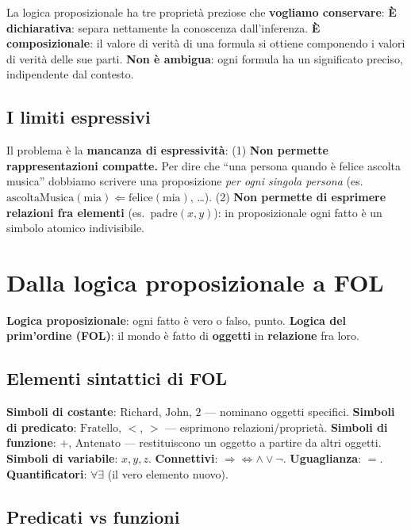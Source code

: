 \documentclass[11pt,a4paper]{report}
\begin{document}
La logica proposizionale ha tre proprietà preziose che \textbf{vogliamo conservare}: \textbf{È dichiarativa}: separa nettamente la conoscenza dall'inferenza. \textbf{È composizionale}: il valore di verità di una formula si ottiene componendo i valori di verità delle sue parti. \textbf{Non è ambigua}: ogni formula ha un significato preciso, indipendente dal contesto.

\subsection*{I limiti espressivi}

Il problema è la \textbf{mancanza di espressività}: (1) \textbf{Non permette rappresentazioni compatte.} Per dire che ``una persona quando è felice ascolta musica'' dobbiamo scrivere una proposizione \emph{per ogni singola persona} (es.\ $\text{ascoltaMusica}(\text{mia}) \Leftarrow \text{felice}(\text{mia})$, \dots). (2) \textbf{Non permette di esprimere relazioni fra elementi} (es.\ $\text{padre}(x,y)$): in proposizionale ogni fatto è un simbolo atomico indivisibile.

\section{Dalla logica proposizionale a FOL}

\textbf{Logica proposizionale}: ogni fatto è vero o falso, punto. \textbf{Logica del prim'ordine (FOL)}: il mondo è fatto di \textbf{oggetti} in \textbf{relazione} fra loro.

\subsection*{Elementi sintattici di FOL}

\textbf{Simboli di costante}: $\text{Richard}$, $\text{John}$, $2$ --- nominano oggetti specifici. \textbf{Simboli di predicato}: $\text{Fratello}$, $<$, $>$ --- esprimono relazioni/proprietà. \textbf{Simboli di funzione}: $+$, $\text{Antenato}$ --- restituiscono un oggetto a partire da altri oggetti. \textbf{Simboli di variabile}: $x,y,z$. \textbf{Connettivi}: $\Rightarrow \Leftrightarrow \wedge \vee \neg$. \textbf{Uguaglianza}: $=$. \textbf{Quantificatori}: $\forall \exists$ (il vero elemento nuovo).

\subsection*{Predicati vs funzioni}
\end{document}
